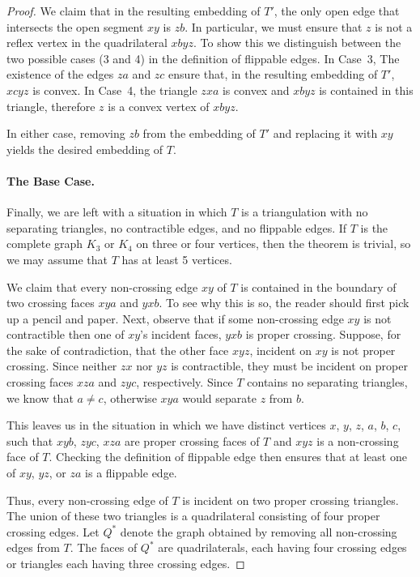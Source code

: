 \documentclass{patmorin}
\begin{document}
\begin{proof}
   We claim that in the resulting embedding of $T'$, the only open edge
   that intersects the open segment $xy$ is $zb$.  In particular, we must
   ensure that $z$ is not a reflex vertex in the quadrilateral $xbyz$.
   To show this we distinguish between the two possible cases (3 and 4)
   in the definition of flippable edges. In Case~3, The existence of the
   edges $za$ and $zc$ ensure that, in the resulting embedding of $T'$,
   $xcyz$ is convex.  In Case~4, the triangle $zxa$ is convex and $xbyz$
   is contained in this triangle, therefore $z$ is a convex vertex
   of $xbyz$.

   In either case, removing $zb$ from the embedding of $T'$ and replacing
   it with $xy$ yields the desired embedding of $T$.

   \paragraph{The Base Case.}

   Finally, we are left with a situation in which $T$ is a triangulation
   with no separating triangles, no contractible edges, and no flippable
   edges.  If $T$ is the complete graph $K_3$ or $K_4$ on three or
   four vertices, then the theorem is trivial, so we may assume that $T$
   has at least 5 vertices.

   We claim that every non-crossing edge $xy$ of $T$ is contained in the
   boundary of two crossing faces $xya$ and $yxb$.  To see why this is
   so, the reader should first pick up a pencil and paper. Next, observe
   that if some non-crossing edge $xy$ is not contractible then one of
   $xy$'s incident faces, $yxb$ is proper crossing.  Suppose, for the
   sake of contradiction, that the other face $xyz$, incident on $xy$
   is not proper crossing.  Since neither $zx$ nor $yz$ is contractible, they
   must be incident on proper crossing faces $xza$ and $zyc$, respectively.
   Since $T$ contains no separating triangles, we know that $a\neq c$,
   otherwise $xya$ would separate $z$ from $b$.

   This leaves us in the situation in which we have distinct vertices $x$,
   $y$, $z$, $a$, $b$, $c$, such that $xyb$, $zyc$, $xza$ are proper crossing
   faces of $T$ and $xyz$ is a non-crossing face of $T$.  Checking the
   definition of flippable edge then ensures that at least one of $xy$,
   $yz$, or $za$ is a flippable edge.

   Thus, every non-crossing edge of $T$ is incident on two proper
   crossing triangles.  The union of these two triangles is a
   quadrilateral consisting of four proper crossing edges.  Let $Q^*$ denote
   the graph obtained by removing all non-crossing edges from $T$.
   The faces of $Q^*$ are quadrilaterals, each having four crossing
   edges or triangles each having three crossing edges.


\end{proof}
\end{document}
